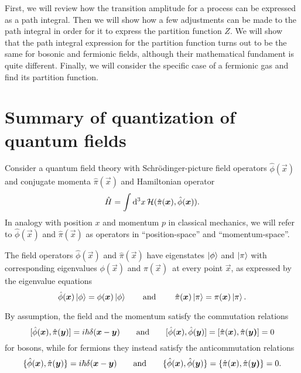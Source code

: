First, we will review how the transition amplitude for a process can be expressed as a path integral.
Then we will show how a few adjustments can be made to the path integral in order for it to express the partition function $Z$.
We will show that the path integral expression for the partition function turns out to be the same for bosonic and fermionic fields, although their mathematical fundament is quite different.
Finally, we will consider the specific case of a fermionic gas and find its partition function.

\section{Summary of quantization of quantum fields}


Consider a quantum field theory with Schrödinger-picture field operators $\hat{\phi}(\vec{x})$ and conjugate momenta $\hat{\pi}(\vec{x})$ and Hamiltonian operator
\begin{equation}
	\hat{H} = \int \mathop{}\!\mathrm{d}^3 x \, \mathcal{H}(\hat{\pi}({\bm{x}}), \hat{\phi}({\bm{x}})) .
\end{equation}
In analogy with position $x$ and momentum $p$ in classical mechanics, we will refer to $\hat\phi(\vec{x})$ and $\hat\pi(\vec{x})$ as operators in ``position-space'' and ``momentum-space''.

The field operators $\hat{\phi}(\vec{x})$ and $\hat{\pi}(\vec{x})$ have eigenstates $\ket{\phi}$ and $\ket{\pi}$ with corresponding eigenvalues $\phi(\vec{x})$ and $\pi(\vec{x})$ at every point $\vec{x}$, as expressed by the eigenvalue equations
\begin{equation}
	\hat{\phi}(\vec{x}) \ket{\phi} = \phi(\vec{x}) \ket{\phi}
	\qquad \text{and} \qquad
	\hat{\pi}(\vec{x}) \ket{\pi} = \pi(\vec{x}) \ket{\pi} .
\label{eq:tft:field_eigenvalue_equations}
\end{equation}

By assumption, the field and the momentum satisfy the commutation relations
\begin{equation}
	[ \hat{\phi}({\bm{x}}) , \hat{\pi}({\bm{y}}) ] = i \hbar \delta({\bm{x}} - {\bm{y}})
	\qquad \text{and} \qquad
	[ \hat{\phi}({\bm{x}}) , \hat{\phi}({\bm{y}}) ] = 
	[ \hat{\pi}({\bm{x}}) , \hat{\pi}({\bm{y)}} ] = 
	0
\label{eq:tft:boson_field_commutators}
\end{equation}
for bosons, while for fermions they instead satisfy the anticommutation relations
\begin{equation}
	\{ \hat{\phi}({\bm{x}}) , \hat{\pi}({\bm{y}}) \} = i \hbar \delta({\bm{x}} - {\bm{y}})
	\qquad \text{and} \qquad
	\{ \hat{\phi}({\bm{x}}) , \hat{\phi}({\bm{y}}) \} = 
	\{ \hat{\pi}({\bm{x}}) , \hat{\pi}({\bm{y)}} \} = 
	0 .
\label{eq:tft:fermion_field_anticommutators}
\end{equation}

